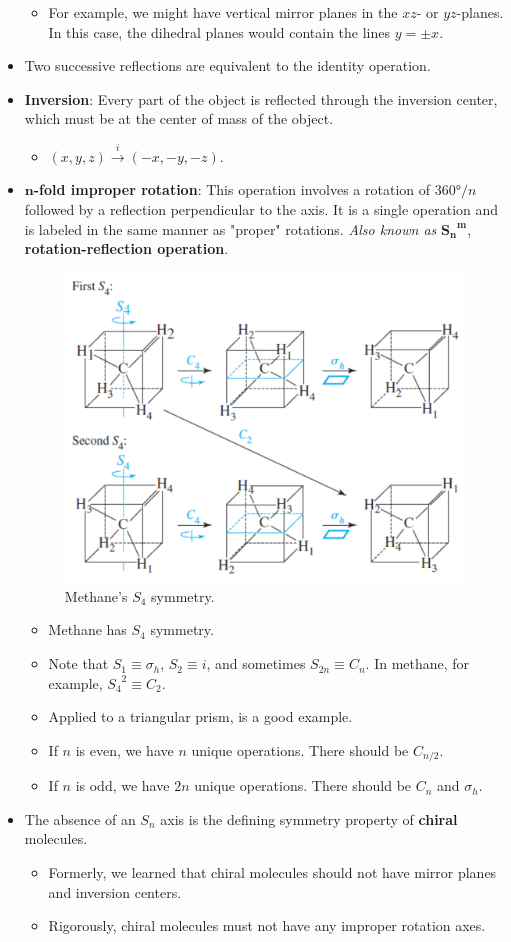 \documentclass[../notes.tex]{subfiles}
\begin{document}
\begin{itemize}
    \begin{itemize}
        \item For example, we might have vertical mirror planes in the $xz$- or $yz$-planes. In this case, the dihedral planes would contain the lines $y=\pm x$.
    \end{itemize}
    \item Two successive reflections are equivalent to the identity operation.
    \item \textbf{Inversion}: Every part of the object is reflected through the inversion center, which must be at the center of mass of the object.
    \begin{itemize}
        \item $(x,y,z)\xrightarrow{i}(-x,-y,-z)$.
    \end{itemize}
    \item \textbf{$\bm{n}$-fold improper rotation}: This operation involves a rotation of $\ang{360}/n$ followed by a reflection perpendicular to the axis. It is a single operation and is labeled in the same manner as "proper" rotations. \emph{Also known as} $\bm{{S_n}^m}$, \textbf{rotation-reflection operation}.
    \begin{figure}[h!]
        \centering
        \includegraphics[width=0.4\linewidth]{../ExtFiles/methaneImproperRotation.png}
        \caption{Methane's $S_4$ symmetry.}
        \label{fig:methaneImproperRotation}
    \end{figure}
    \begin{itemize}
        \item Methane has $S_4$ symmetry.
        \item Note that $S_1\equiv\sigma_h$, $S_2\equiv i$, and sometimes $S_{2n}\equiv C_n$. In methane, for example, ${S_4}^2\equiv C_2$.
        \item Applied to a triangular prism, is a good example.
        \item If $n$ is even, we have $n$ unique operations. There should be $C_{n/2}$.
        \item If $n$ is odd, we have $2n$ unique operations. There should be $C_n$ and $\sigma_h$.
    \end{itemize}
    \item The absence of an $S_n$ axis is the defining symmetry property of \textbf{chiral} molecules.
    \begin{itemize}
        \item Formerly, we learned that chiral molecules should not have mirror planes and inversion centers.
        \item Rigorously, chiral molecules must not have any improper rotation axes.
    \end{itemize}
\end{itemize}
\end{document}
